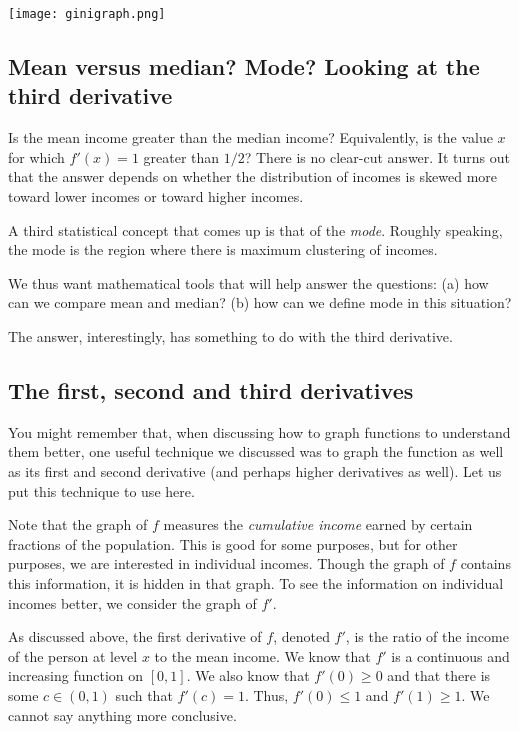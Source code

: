 \documentclass{amsart}
\begin{document}
\texttt{[image: ginigraph.png]}

\subsection{Mean versus median? Mode? Looking at the third derivative}

Is the mean income greater than the median income? Equivalently, is
the value $x$ for which $f'(x) = 1$ greater than $1/2$? There is no
clear-cut answer. It turns out that the answer depends on whether the
distribution of incomes is skewed more toward lower incomes or toward
higher incomes.

A third statistical concept that comes up is that of the {\em
mode}. Roughly speaking, the mode is the region where there is maximum
clustering of incomes.

We thus want mathematical tools that will help answer the questions:
(a) how can we compare mean and median? (b) how can we define mode in
this situation?

The answer, interestingly, has something to do with the third
derivative.

\subsection{The first, second and third derivatives}

You might remember that, when discussing how to graph functions to
understand them better, one useful technique we discussed was to graph
the function as well as its first and second derivative (and perhaps
higher derivatives as well). Let us put this technique to use here.

Note that the graph of $f$ measures the {\em cumulative income} earned
by certain fractions of the population. This is good for some
purposes, but for other purposes, we are interested in individual
incomes. Though the graph of $f$ contains this information, it is
hidden in that graph. To see the information on individual incomes
better, we consider the graph of $f'$.

As discussed above, the first derivative of $f$, denoted $f'$, is the
ratio of the income of the person at level $x$ to the mean income. We
know that $f'$ is a continuous and increasing function on $[0,1]$. We
also know that $f'(0) \ge 0$ and that there is some $c \in (0,1)$ such
that $f'(c) = 1$. Thus, $f'(0) \le 1$ and $f'(1) \ge 1$. We cannot say
anything more conclusive.
\end{document}
